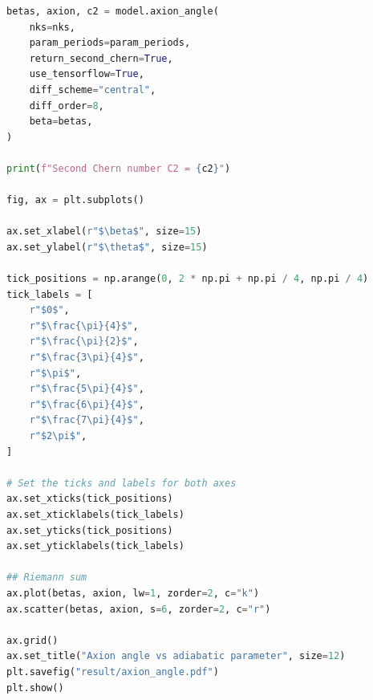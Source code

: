 \begin{lstlisting}[language=Python, caption={Analisis Plot Fungsi \textit{Axion Angle}}, label={lst:axion}]
betas, axion, c2 = model.axion_angle(
    nks=nks,
    param_periods=param_periods,
    return_second_chern=True,
    use_tensorflow=True,
    diff_scheme="central",
    diff_order=8,
    beta=betas,
)

print(f"Second Chern number C2 = {c2}")

fig, ax = plt.subplots()

ax.set_xlabel(r"$\beta$", size=15)
ax.set_ylabel(r"$\theta$", size=15)

tick_positions = np.arange(0, 2 * np.pi + np.pi / 4, np.pi / 4)
tick_labels = [
    r"$0$",
    r"$\frac{\pi}{4}$",
    r"$\frac{\pi}{2}$",
    r"$\frac{3\pi}{4}$",
    r"$\pi$",
    r"$\frac{5\pi}{4}$",
    r"$\frac{6\pi}{4}$",
    r"$\frac{7\pi}{4}$",
    r"$2\pi$",
]

# Set the ticks and labels for both axes
ax.set_xticks(tick_positions)
ax.set_xticklabels(tick_labels)
ax.set_yticks(tick_positions)
ax.set_yticklabels(tick_labels)

## Riemann sum
ax.plot(betas, axion, lw=1, zorder=2, c="k")
ax.scatter(betas, axion, s=6, zorder=2, c="r")

ax.grid()
ax.set_title("Axion angle vs adiabatic parameter", size=12)
plt.savefig("result/axion_angle.pdf")
plt.show()

\end{lstlisting}
